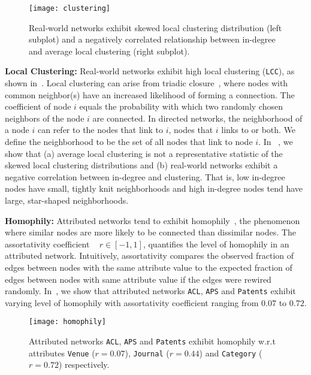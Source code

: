 \begin{figure}
 \centering
 \texttt{[image: clustering]}
 \caption{
    Real-world networks exhibit
    skewed local clustering distribution (left subplot) and a negatively correlated
    relationship between in-degree and average local clustering (right subplot).
 }
 \label{fig:cc_dc}
\end{figure}

\textbf{Local Clustering:}
Real-world networks exhibit high local clustering
(\texttt{LCC}), as shown in~. Local
clustering can arise from triadic closure~\cite{simmel1950sociology,
newman2001clustering}, where nodes with common neighbor(s) have an increased
likelihood of forming a connection.
The coefficient of node $i$ equals the probability with which two randomly chosen
neighbors of the node $i$ are connected. In directed networks, the neighborhood
of a node $i$ can refer to the nodes that link to $i$, nodes that
$i$ links to or both. We define the neighborhood to be the set
of all nodes that link to node $i$. In ~, we show that (a) average local clustering is not a
representative statistic of the skewed local clustering distributions and (b) real-world networks
exhibit a negative correlation between in-degree and clustering.
That is, low in-degree nodes have small, tightly knit neighborhoods
and high in-degree nodes tend have large, star-shaped neighborhoods.


\textbf{Homophily:}
Attributed networks tend to exhibit homophily~\cite{mcpherson2001birds}, the
phenomenon where similar nodes are more likely to be connected than dissimilar
nodes. The assortativity coefficient ~\cite{newman2002assortative} $r \in [-1,
1]$, quantifies the level of homophily in an attributed network.
Intuitively,
assortativity compares the observed fraction of edges between nodes with the same attribute
value to the expected fraction of edges between nodes with same attribute value
if the edges were rewired randomly. In~, we show that
attributed networks \texttt{ACL}, \texttt{APS} and \texttt{Patents} exhibit
varying level of homophily with assortativity coefficient ranging from $0.07$ to
$0.72$.


\begin{figure}
 \centering
 \texttt{[image: homophily]}
 \caption{
    Attributed networks \texttt{ACL}, \texttt{APS} and \texttt{Patents} exhibit
    homophily w.r.t attributes \texttt{Venue} ($r=0.07$), \texttt{Journal} ($r=0.44$) and
    \texttt{Category} ($r=0.72$) respectively.
 }
 \label{fig:mixing}
 \vspace{-20pt}
\end{figure}



